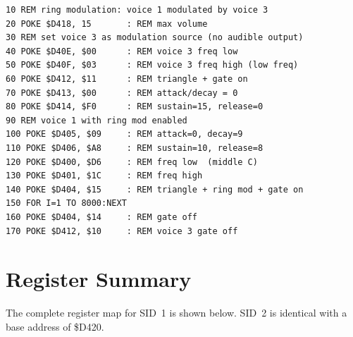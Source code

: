 \begin{lstlisting}
10 REM ring modulation: voice 1 modulated by voice 3
20 POKE $D418, 15       : REM max volume
30 REM set voice 3 as modulation source (no audible output)
40 POKE $D40E, $00      : REM voice 3 freq low
50 POKE $D40F, $03      : REM voice 3 freq high (low freq)
60 POKE $D412, $11      : REM triangle + gate on
70 POKE $D413, $00      : REM attack/decay = 0
80 POKE $D414, $F0      : REM sustain=15, release=0
90 REM voice 1 with ring mod enabled
100 POKE $D405, $09     : REM attack=0, decay=9
110 POKE $D406, $A8     : REM sustain=10, release=8
120 POKE $D400, $D6     : REM freq low  (middle C)
130 POKE $D401, $1C     : REM freq high
140 POKE $D404, $15     : REM triangle + ring mod + gate on
150 FOR I=1 TO 8000:NEXT
160 POKE $D404, $14     : REM gate off
170 POKE $D412, $10     : REM voice 3 gate off
\end{lstlisting}


\section{Register Summary}
\label{sec:sid-summary}

The complete register map for SID~1 is shown below.  SID~2 is identical with
a base address of \$D420.

